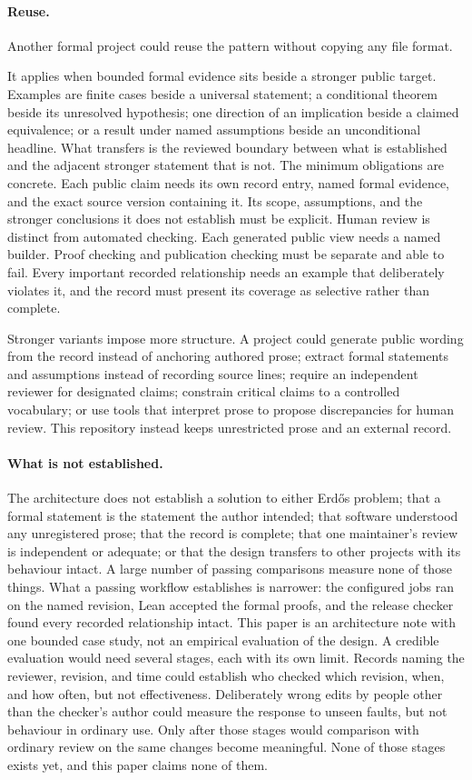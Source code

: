 \documentclass[11pt]{article}
\begin{document}
\paragraph{Reuse.}
Another formal project could reuse the pattern without copying any file
format.\par\pagebreak\noindent
It applies when bounded formal evidence sits beside a stronger public
target.  Examples are finite cases beside a universal statement;
a conditional theorem beside its unresolved hypothesis; one direction of an
implication beside a claimed equivalence; or a result under named assumptions beside an unconditional
headline.  What transfers is the reviewed boundary between what is established
and the adjacent stronger statement that is not.  The minimum obligations are concrete.
Each public claim needs its own record entry, named formal evidence, and the
exact source version containing it.  Its scope, assumptions, and the stronger
conclusions it does not establish must be explicit.
Human review is distinct from automated checking.  Each generated
public view needs a named builder.  Proof checking and publication
checking must be separate and able to fail.  Every important recorded
relationship needs an example that deliberately violates it, and the record
must present its coverage as selective rather than complete.

Stronger variants impose more structure.  A project could generate public
wording from the record instead of anchoring authored prose; extract formal
statements and assumptions instead of recording source lines; require an
independent reviewer for designated claims; constrain critical claims to a
controlled vocabulary; or use tools that interpret prose to propose discrepancies for
human review.  This repository instead keeps unrestricted prose and an
external record.

\paragraph{What is not established.}
The architecture does not
establish a solution to either Erd\H{o}s problem; that a formal statement is
the statement the author intended; that software understood any unregistered
prose; that the record is complete; that one maintainer's review is
independent or adequate; or that the design transfers to other projects with
its behaviour intact.  A large number of passing comparisons measure none of
those things.  What a passing workflow establishes is narrower: the
configured jobs ran on the named revision, Lean accepted the formal proofs,
and the release checker found every recorded relationship intact.  This paper
is an architecture note with one bounded case study,
not an empirical evaluation of the design.  A credible evaluation would need
several stages, each with its own limit.  Records naming the reviewer, revision,
and time could establish who checked which revision, when, and how often, but
not effectiveness.  Deliberately wrong edits by people other than the checker's
author could measure the response to unseen faults, but not
behaviour in ordinary use.  Only after those stages would comparison with ordinary review
on the same changes become meaningful.  None of those stages exists yet, and
this paper claims none of them.
\end{document}
